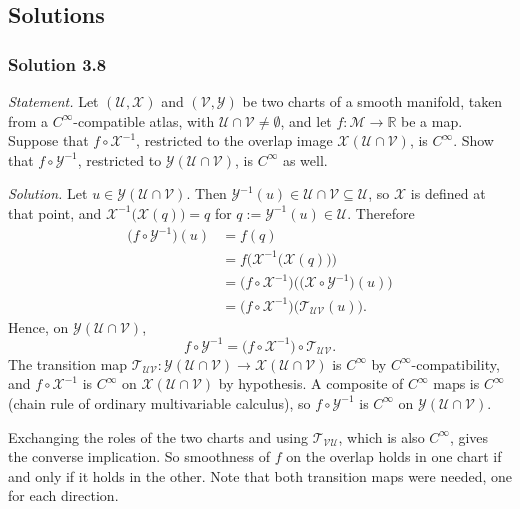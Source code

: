 \documentclass[11pt]{article}
\begin{document}
\subsection*{Solutions}

\subsubsection*{Solution 3.8}

\noindent\textit{Statement.} Let $(\mathcal U,\mathcal X)$ and $(\mathcal V,\mathcal Y)$ be two charts of a smooth manifold, taken from a $C^\infty$-compatible atlas, with $\mathcal U\cap\mathcal V\neq\emptyset$, and let $f:\mathcal M\to\mathbb R$ be a map. Suppose that $f\circ\mathcal X^{-1}$, restricted to the overlap image $\mathcal X(\mathcal U\cap\mathcal V)$, is $C^\infty$. Show that $f\circ\mathcal Y^{-1}$, restricted to $\mathcal Y(\mathcal U\cap\mathcal V)$, is $C^\infty$ as well.

\medskip
\noindent\textit{Solution.} Let $u\in\mathcal Y(\mathcal U\cap\mathcal V)$. Then $\mathcal Y^{-1}(u)\in\mathcal U\cap\mathcal V\subseteq\mathcal U$, so $\mathcal X$ is defined at that point, and $\mathcal X^{-1}\big(\mathcal X(q)\big)=q$ for $q:=\mathcal Y^{-1}(u)\in\mathcal U$. Therefore
\begin{align*}
\big(f\circ\mathcal Y^{-1}\big)(u)
&=f(q)\\
&=f\Big(\mathcal X^{-1}\big(\mathcal X(q)\big)\Big)\\
&=\big(f\circ\mathcal X^{-1}\big)\Big(\big(\mathcal X\circ\mathcal Y^{-1}\big)(u)\Big)\\
&=\big(f\circ\mathcal X^{-1}\big)\big(\mathcal T_{\mathcal{UV}}(u)\big).
\end{align*}
Hence, on $\mathcal Y(\mathcal U\cap\mathcal V)$,
\[
f\circ\mathcal Y^{-1}=\big(f\circ\mathcal X^{-1}\big)\circ\mathcal T_{\mathcal{UV}}.
\]
The transition map $\mathcal T_{\mathcal{UV}}:\mathcal Y(\mathcal U\cap\mathcal V)\to\mathcal X(\mathcal U\cap\mathcal V)$ is $C^\infty$ by $C^\infty$-compatibility, and $f\circ\mathcal X^{-1}$ is $C^\infty$ on $\mathcal X(\mathcal U\cap\mathcal V)$ by hypothesis. A composite of $C^\infty$ maps is $C^\infty$ (chain rule of ordinary multivariable calculus), so $f\circ\mathcal Y^{-1}$ is $C^\infty$ on $\mathcal Y(\mathcal U\cap\mathcal V)$.

Exchanging the roles of the two charts and using $\mathcal T_{\mathcal{VU}}$, which is also $C^\infty$, gives the converse implication. So smoothness of $f$ on the overlap holds in one chart if and only if it holds in the other. Note that both transition maps were needed, one for each direction.
\end{document}
